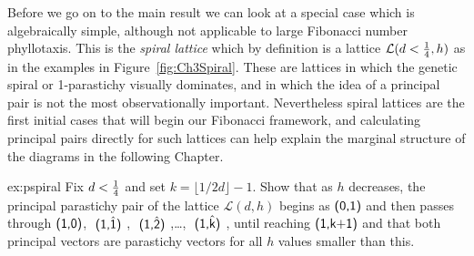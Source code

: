 Before we go on to the main result we can look at a special case which is algebraically simple, although not applicable to large Fibonacci number phyllotaxis. This is the \emph{spiral lattice} which by definition is a lattice $\mathcal{L}(d<\textstyle{\frac{1}{4}},h)$ as in the examples in Figure~\ref{fig:Ch3Spiral}. These are lattices in which
the genetic spiral or 1-parastichy visually dominates, and in which the idea of a principal pair is not the most observationally important. 
%
Nevertheless spiral lattices are the first initial cases that will begin
our Fibonacci framework, and calculating principal pairs directly for such lattices can help explain the marginal structure of the diagrams in the following Chapter.
\begin{jExercise}{ex:pspiral}
	Fix  $d<\textstyle{\frac{1}{4}}$ and set  $k=\lfloor1/2d\rfloor-1$.
	Show that as $h$ decreases, the principal parastichy pair of the lattice $\mathcal{L}(d,h)$ begins as 
	 $\textsf{(0,1)}$ and then passes through $\textsf{(1,0)}$,  $\textsf{ (\ensuremath{\textsf{1}},\ensuremath{\hat{\textsf{1}}}) }$,
	  $\textsf{ (\ensuremath{\textsf{1}},\ensuremath{\hat{\textsf{2}}}) }$,\ldots ,  $\textsf{ (\ensuremath{\textsf{1}},\ensuremath{\hat{\textsf{k}}}) }$, until reaching $\textsf{(1,k+1)}$ and that  both principal vectors are parastichy vectors for all $h$ values smaller than this. 
	 
\end{jExercise} 
